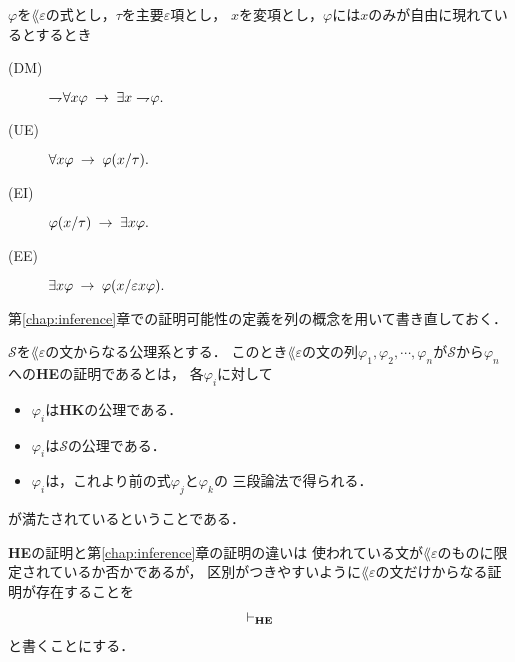 	\begin{screen}
		\begin{logicalaxm}[{\bf HE}の公理(量化)]
			$\varphi$を$\lang{\varepsilon}の$式とし，$\tau$を主要$\varepsilon$項とし，
			$x$を変項とし，$\varphi$には$x$のみが自由に現れているとするとき
			\begin{description}
				\item[(DM)] $\rightharpoondown\hspace{-0.25em} \forall x \varphi
					\hspace{0.25em}\rightarrow\hspace{0.25em} \exists x \rightharpoondown\hspace{-0.25em} \varphi.$
				
				\item[(UE)] $\forall x \varphi \hspace{0.25em}\rightarrow\hspace{0.25em} \varphi(x/\tau).$
				
				\item[(EI)] $\varphi(x/\tau) \hspace{0.25em}\rightarrow\hspace{0.25em} \exists x \varphi.$
				
				\item[(EE)] $\exists x \varphi \hspace{0.25em}\rightarrow\hspace{0.25em} \varphi(x/\varepsilon x \varphi).$
			\end{description}
		\end{logicalaxm}
	\end{screen}
	
	第\ref{chap:inference}章での証明可能性の定義を列の概念を用いて書き直しておく．
	
	\begin{screen}
		\begin{metadfn}[{\bf HE}における証明]
			$\mathscr{S}$を$\lang{\varepsilon}$の文からなる公理系とする．
			このとき$\lang{\varepsilon}$の文の列$\varphi_{1},\varphi_{2},\cdots,
			\varphi_{n}$が$\mathscr{S}$から$\varphi_{n}$への{\bf HE}の証明であるとは，
			各$\varphi_{i}$に対して
			\begin{itemize}
				\item $\varphi_{i}$は{\bf HK}の公理である．
				\item $\varphi_{i}$は$\mathscr{S}$の公理である．
				\item $\varphi_{i}$は，これより前の式$\varphi_{j}$と$\varphi_{k}$の
					三段論法で得られる．
			\end{itemize}
			が満たされているということである．
		\end{metadfn}
	\end{screen}
	
	{\bf HE}の証明と第\ref{chap:inference}章の証明の違いは
	使われている文が$\lang{\varepsilon}$のものに限定されているか否かであるが，
	区別がつきやすいように$\lang{\varepsilon}$の文だけからなる証明が存在することを
	\begin{align}
		\vdash_{{\scriptsize \mbox{{\bf HE}}}}
	\end{align}
	と書くことにする．
	
